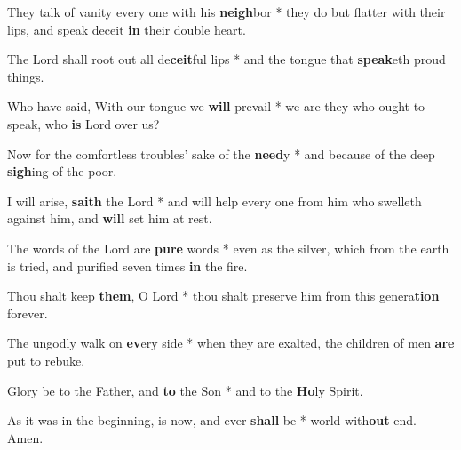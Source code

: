 \begin{multicols}{2}
	They talk of vanity every one with his \textbf{neigh}bor * they do but flatter with their lips, and speak deceit \textbf{in} their double heart.
	
	The Lord shall root out all de\textbf{ceit}ful lips * and the tongue that \textbf{speak}eth proud things.
	
	Who have said, With our tongue we \textbf{will} prevail * we are they who ought to speak, who \textbf{is} Lord over us?
	
	Now for the comfortless troubles' sake of the \textbf{need}y * and because of the deep \textbf{sigh}ing of the poor.
	
	I will arise, \textbf{saith} the Lord * and will help every one from him who swelleth against him, and \textbf{will} set him at rest.
	
	The words of the Lord are \textbf{pure} words * even as the silver, which from the earth is tried, and purified seven times \textbf{in} the fire.
	
	Thou shalt keep \textbf{them}, O Lord * thou shalt preserve him from this genera\textbf{tion} forever.
	
	The ungodly walk on \textbf{ev}ery side * when they are exalted, the children of men \textbf{are} put to rebuke.
	
	Glory be to the Father, and \textbf{to} the Son * and to the \textbf{Ho}ly Spirit.
	
	As it was in the beginning, is now, and ever \textbf{shall} be * world with\textbf{out} end. Amen.
\end{multicols}